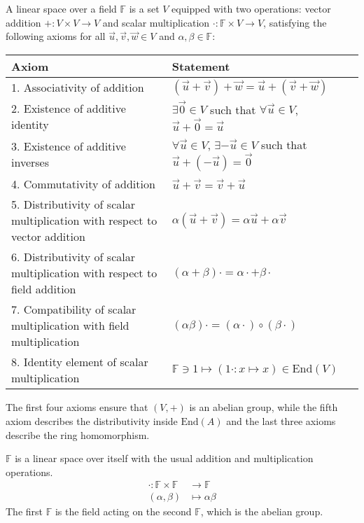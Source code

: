\documentclass[
	11pt, %
	fleqn, %
	a4paper, %
]{LegrandOrangeBook}
\newcommand{\End}[1]{\text{End}(#1)} %
\newcommand{\F}{\mathbb{F}} %
\begin{document}
\begin{corollary}
    A linear space over a field $\F$ is a set $V$ equipped with two operations: vector addition $+: V \times V \to V$ and scalar multiplication $\cdot : \F \times V \to V$, satisfying the following axioms for all $\vec{u}, \vec{v}, \vec{w} \in V$ and $\alpha, \beta \in \F$:
    \begin{center}
        \begin{tabularx}{\textwidth}{XX}
            \toprule
            \textbf{Axiom} & \textbf{Statement} \\
            \midrule
            1. Associativity of addition & $(\vec{u} + \vec{v}) + \vec{w} = \vec{u} + (\vec{v} + \vec{w})$ \\
            2. Existence of additive identity & $\exists \vec{0} \in V$ such that $\forall \vec{u} \in V$, $\vec{u} + \vec{0} = \vec{u}$ \\
            3. Existence of additive inverses & $\forall \vec{u} \in V$, $\exists -\vec{u} \in V$ such that $\vec{u} + (-\vec{u}) = \vec{0}$ \\
            4. Commutativity of addition & $\vec{u} + \vec{v} = \vec{v} + \vec{u}$ \\
            5. Distributivity of scalar multiplication with respect to vector addition & $\alpha (\vec{u} + \vec{v}) = \alpha \vec{u} + \alpha \vec{v}$ \\
            6. Distributivity of scalar multiplication with respect to field addition & $(\alpha + \beta) \cdot = \alpha \cdot + \beta \cdot$ \\
            7. Compatibility of scalar multiplication with field multiplication & $(\alpha \beta) \cdot = (\alpha \cdot) \circ (\beta \cdot)$ \\
            8. Identity element of scalar multiplication & $\F \ni 1 \mapsto (1\cdot : x \mapsto x) \in \End{V}$ \\
            \bottomrule
        \end{tabularx}
    \end{center}
\end{corollary}

\begin{remark}
    The first four axioms ensure that $(V, +)$ is an abelian group, while the fifth axiom describes the distributivity inside $\End{A}$ and the last three axioms describe the ring homomorphism.
\end{remark}

\begin{example}
    $\F$ is a linear space over itself with the usual addition and multiplication operations.
    \[
        \begin{split}
            \cdot : \F \times \F &\to \F \\
            (\alpha,\beta) &\mapsto \alpha \beta
        \end{split}
    \]
    The first $\F$ is the field acting on the second $\F$, which is the abelian group.
\end{example}
\end{document}
